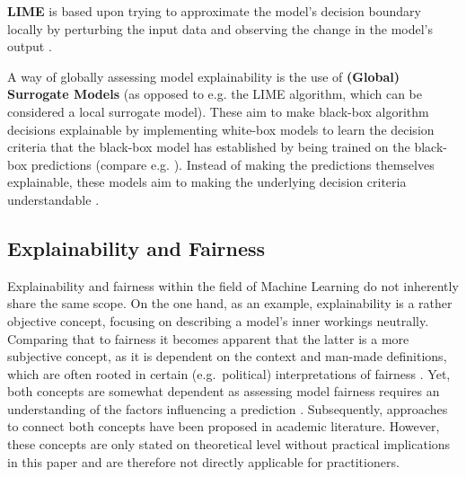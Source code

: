 \textbf{LIME} is based upon trying to approximate the model's decision boundary locally by perturbing the input data and observing the change in the model's output \parencite{Molnar2023}.

A way of globally assessing model explainability is the use of \textbf{(Global) Surrogate Models} (as opposed to e.g. the LIME algorithm, which can be considered a local surrogate model). 
These aim to make black-box algorithm decisions explainable by implementing white-box models to learn the decision criteria that the black-box model has established by being trained on the black-box predictions (compare e.g. \cite{Karim2023}).
Instead of making the predictions themselves explainable, these models aim to making the underlying decision criteria understandable \parencite{Molnar2023}.

\subsection{Explainability and Fairness}\label{subsec:Explainability_fairness}


Explainability and fairness within the field of Machine Learning do not inherently share the same scope. On the one hand, as an example, explainability is a rather objective concept, focusing on describing a model's inner workings neutrally. 
Comparing that to fairness it becomes apparent that the latter is a more subjective concept, as it is dependent on the context and man-made definitions, which are often rooted in certain (e.g.\ political) interpretations of fairness \parencite{Deepak2021}.
Yet, both concepts are somewhat dependent as assessing model fairness requires an understanding of the factors influencing a prediction \parencite{Zhou2022}.
Subsequently, approaches to connect both concepts have been proposed in academic literature. 
However, these concepts are only stated on theoretical level without practical implications in this paper and are therefore not directly applicable for practitioners.


